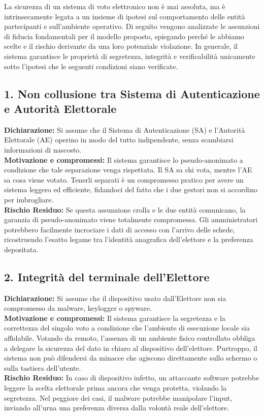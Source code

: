 La sicurezza di un sistema di voto elettronico non è mai assoluta, ma è intrinsecamente legata a un insieme di ipotesi sul comportamento delle entità partecipanti e sull'ambiente operativo. Di seguito vengono analizzate le assunzioni di fiducia fondamentali per il modello proposto, spiegando perché le abbiamo scelte e il rischio derivante da una loro potenziale violazione. In generale, il sistema garantisce le proprietà di segretezza, integrità e verificabilità unicamente sotto l'ipotesi che le seguenti condizioni siano verificate.

\subsection*{1. Non collusione tra Sistema di Autenticazione e Autorità Elettorale}
\textbf{Dichiarazione:} Si assume che il Sistema di Autenticazione (SA) e l'Autorità Elettorale (AE) operino in modo del tutto indipendente, senza scambiarsi informazioni di nascosto. \\
\textbf{Motivazione e compromessi:} Il sistema garantisce lo pseudo-anonimato a condizione che tale separazione venga rispettata. Il SA sa chi vota, mentre l'AE sa cosa viene votato. Tenerli separati è un compromesso pratico per avere un sistema leggero ed efficiente, fidandoci del fatto che i due gestori non si accordino per imbrogliare. \\
\textbf{Rischio Residuo:} Se questa assunzione crolla e le due entità comunicano, la garanzia di pseudo-anonimato viene totalmente compromessa. Gli amministratori potrebbero facilmente incrociare i dati di accesso con l'arrivo delle schede, ricostruendo l'esatto legame tra l'identità anagrafica dell'elettore e la preferenza depositata.

\subsection*{2. Integrità del terminale dell'Elettore}
\textbf{Dichiarazione:} Si assume che il dispositivo usato dall'Elettore non sia compromesso da malware, keylogger o spyware. \\
\textbf{Motivazione e compromessi:} Il sistema garantisce la segretezza e la correttezza del singolo voto a condizione che l'ambiente di esecuzione locale sia affidabile. Votando da remoto, l'assenza di un ambiente fisico controllato obbliga a delegare la sicurezza del dato in chiaro al dispositivo dell'elettore. Purtroppo, il sistema non può difendersi da minacce che agiscono direttamente sullo schermo o sulla tastiera dell'utente. \\
\textbf{Rischio Residuo:} In caso di dispositivo infetto, un attaccante software potrebbe leggere la scelta elettorale prima ancora che venga protetta, violando la segretezza. Nel peggiore dei casi, il malware potrebbe manipolare l'input, inviando all'urna una preferenza diversa dalla volontà reale dell'elettore.

